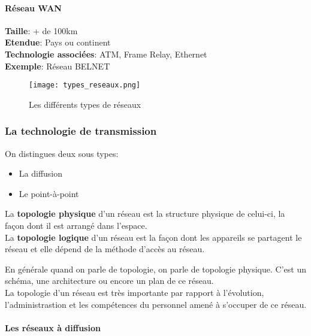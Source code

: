 \documentclass[10pt,a4paper]{article}
\begin{document}
 \paragraph{Réseau WAN}\leavevmode

 \medskip

 \indent
 \textbf{Taille}: + de 100km\\
 \indent
 \textbf{Etendue}: Pays ou continent\\
 \indent
 \textbf{Technologie associées}: ATM, Frame Relay, Ethernet\\
 \indent
 \textbf{Exemple}: Réseau BELNET\\

 \begin{figure}[h]
	 \centering
	 \texttt{[image: types\_reseaux.png]}
	 \caption{Les différents types de réseaux}
 \end{figure}

 \subsubsection{La technologie de transmission}
 On distingues deux sous types:
 \begin{itemize}
	 \item La diffusion
	 \item Le point-à-point
 \end{itemize}

 \indent
 La \textbf{topologie physique} d'un réseau est la structure physique de celui-ci, la façon dont il est arrangé dans l'espace.\\
 \indent
 La \textbf{topologie logique} d'un réseau est la façon dont les appareils se partagent le réseau et elle dépend de la méthode d'accès au réseau.\\

 \smallskip

 \indent
 En générale quand on parle de topologie, on parle de topologie physique. C'est un schéma, une architecture ou encore un plan de ce réseau.\\
 La topologie d'un réseau est très importante par rapport à l'évolution, l'administrastion et les compétences du personnel amené à s'occuper de ce réseau.
 \paragraph{Les réseaux à diffusion}\leavevmode

 \smallskip
\end{document}
